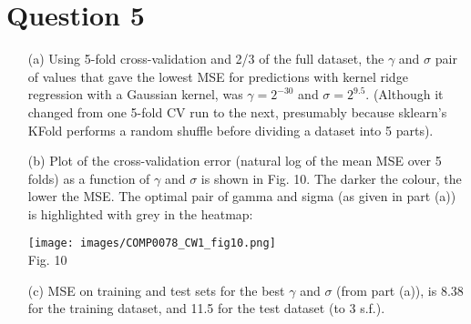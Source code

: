 \documentclass[a4paper,12pt]{article}
\begin{document}
\section*{Question 5}
\begin{enumerate}
\item[(a)] Using 5-fold cross-validation and 2/3 of the full dataset, the $\gamma$ and $\sigma$ pair of values that gave the lowest MSE for predictions with kernel ridge regression with a Gaussian kernel, was $\gamma=2^{-30}$ and $\sigma=2^{9.5}$. (Although it changed from one 5-fold CV run to the next, presumably because sklearn's KFold performs a random shuffle before dividing a dataset into 5 parts).

\item[(b)] Plot of the cross-validation error (natural log of the mean MSE over 5 folds) as a function of $\gamma$ and $\sigma$ is shown in Fig. 10. The darker the colour, the lower the MSE. The optimal pair of gamma and sigma (as given in part (a)) is highlighted with grey in the heatmap:

\texttt{[image: images/COMP0078\_CW1\_fig10.png]}\\
Fig. 10 \\

\item[(c)] MSE on training and test sets for the best $\gamma$ and $\sigma$ (from part (a)), is 8.38 for the training dataset, and 11.5  for the test dataset (to 3 s.f.). 

\end{enumerate}
\clearpage
\end{document}
